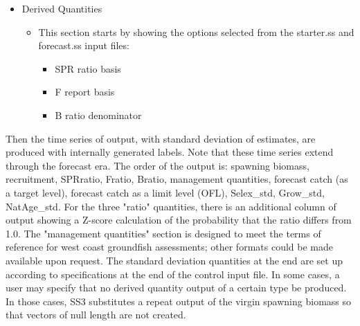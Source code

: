 \begin{itemize}
\begin{itemize}
		\end{itemize}
	\item Derived Quantities
		\begin{itemize}
			\item This section starts by showing the options selected from the starter.ss and forecast.ss input files:
				\begin{itemize}
					\item SPR ratio basis
					\item F report basis
					\item B ratio denominator
				\end{itemize}
		\end{itemize}
\end{itemize}

Then the time series of output, with standard deviation of estimates, are produced with internally generated labels.  Note that these time series extend through the forecast era.  The order of the output is: spawning biomass, recruitment, SPRratio, Fratio, Bratio, management quantities, forecast catch (as a target level), forecast catch as a limit level (OFL), Selex\_std, Grow\_std, NatAge\_std.  For the three "ratio" quantities, there is an additional column of output showing a Z-score calculation of the probability that the ratio differs from 1.0. The "management quantities" section is designed to meet the terms of reference for west coast groundfish assessments; other formats could be made available upon request. The standard deviation quantities at the end are set up according to specifications at the end of the control input file. In some cases, a user may specify that no derived quantity output of a certain type be produced. In those cases, SS3 substitutes a repeat output of the virgin spawning biomass so that vectors of null length are not created.

